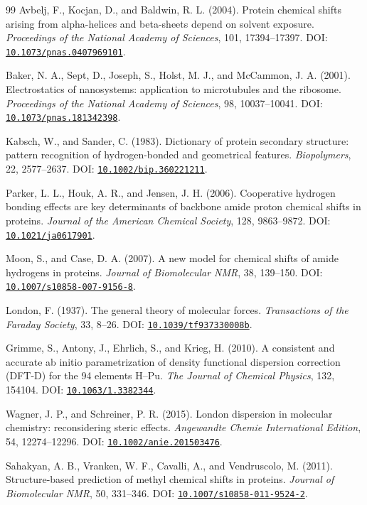 \documentclass[11pt]{article}
\newcommand{\doi}[1]{\href{https://doi.org/#1}{\nolinkurl{#1}}}
\begin{document}
\begin{thebibliography}{99}
Avbelj, F., Kocjan, D., and Baldwin, R. L. (2004).
Protein chemical shifts arising from alpha-helices and beta-sheets depend on
solvent exposure.
\emph{Proceedings of the National Academy of Sciences}, 101, 17394--17397.
DOI: \doi{10.1073/pnas.0407969101}.

Baker, N. A., Sept, D., Joseph, S., Holst, M. J., and McCammon, J. A. (2001).
Electrostatics of nanosystems: application to microtubules and the ribosome.
\emph{Proceedings of the National Academy of Sciences}, 98, 10037--10041.
DOI: \doi{10.1073/pnas.181342398}.

Kabsch, W., and Sander, C. (1983).
Dictionary of protein secondary structure: pattern recognition of
hydrogen-bonded and geometrical features.
\emph{Biopolymers}, 22, 2577--2637.
DOI: \doi{10.1002/bip.360221211}.

Parker, L. L., Houk, A. R., and Jensen, J. H. (2006).
Cooperative hydrogen bonding effects are key determinants of backbone amide
proton chemical shifts in proteins.
\emph{Journal of the American Chemical Society}, 128, 9863--9872.
DOI: \doi{10.1021/ja0617901}.

Moon, S., and Case, D. A. (2007).
A new model for chemical shifts of amide hydrogens in proteins.
\emph{Journal of Biomolecular NMR}, 38, 139--150.
DOI: \doi{10.1007/s10858-007-9156-8}.

London, F. (1937).
The general theory of molecular forces.
\emph{Transactions of the Faraday Society}, 33, 8--26.
DOI: \doi{10.1039/tf937330008b}.

Grimme, S., Antony, J., Ehrlich, S., and Krieg, H. (2010).
A consistent and accurate ab initio parametrization of density functional
dispersion correction (DFT-D) for the 94 elements H--Pu.
\emph{The Journal of Chemical Physics}, 132, 154104.
DOI: \doi{10.1063/1.3382344}.

Wagner, J. P., and Schreiner, P. R. (2015).
London dispersion in molecular chemistry: reconsidering steric effects.
\emph{Angewandte Chemie International Edition}, 54, 12274--12296.
DOI: \doi{10.1002/anie.201503476}.

Sahakyan, A. B., Vranken, W. F., Cavalli, A., and Vendruscolo, M. (2011).
Structure-based prediction of methyl chemical shifts in proteins.
\emph{Journal of Biomolecular NMR}, 50, 331--346.
DOI: \doi{10.1007/s10858-011-9524-2}.


\end{thebibliography}
\end{document}
